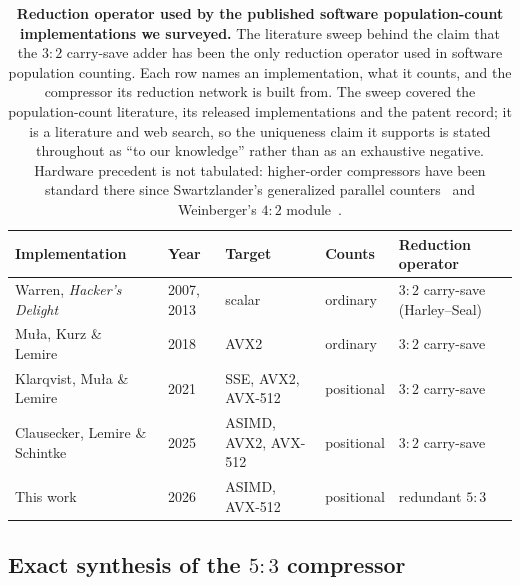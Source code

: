 \documentclass[fleqn,10pt]{wlscirep}
\begin{document}
\begin{table}[!ht]
\centering
\small\setlength{\tabcolsep}{5pt}
\caption{\label{stab:survey}\textbf{Reduction operator used by the published software population-count implementations we surveyed.} The literature sweep behind the claim that the $3{:}2$ carry-save adder has been the only reduction operator used in software population counting. Each row names an implementation, what it counts, and the compressor its reduction network is built from. The sweep covered the population-count literature, its released implementations and the patent record; it is a literature and web search, so the uniqueness claim it supports is stated throughout as ``to our knowledge'' rather than as an exhaustive negative. Hardware precedent is not tabulated: higher-order compressors have been standard there since Swartzlander's generalized parallel counters~\cite{swartzlander1973} and Weinberger's $4{:}2$ module~\cite{weinberger1981}.}
\begin{tabular}{@{}l l | l l l@{}}
\toprule
Implementation & Year & Target & Counts & Reduction operator\\
\midrule
Warren, \emph{Hacker's Delight}~\cite{warren2007,warren2013} & 2007, 2013 & scalar & ordinary & $3{:}2$ carry-save (Harley--Seal)\\
Mu{\l}a, Kurz \& Lemire~\cite{Mula2016} & 2018 & AVX2 & ordinary & $3{:}2$ carry-save\\
Klarqvist, Mu{\l}a \& Lemire~\cite{klarqvist2019} & 2021 & SSE, AVX2, AVX-512 & positional & $3{:}2$ carry-save\\
Clausecker, Lemire \& Schintke~\cite{clausecker2024} & 2025 & ASIMD, AVX2, AVX-512 & positional & $3{:}2$ carry-save\\
\midrule
This work & 2026 & ASIMD, AVX-512 & positional & redundant $5{:}3$\\
\bottomrule
\end{tabular}
\end{table}

\subsection*{Exact synthesis of the $5{:}3$ compressor}
\end{document}
